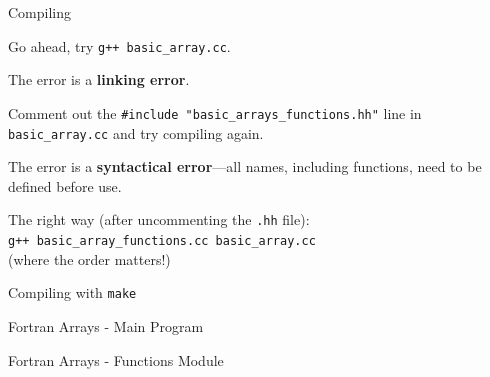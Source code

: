 \documentclass[aspectratio=1610]{beamer}
\begin{document}
\begin{frame}{Compiling}

 Go ahead, try {\tt g++ basic\_array.cc}.

 \pause
 
 \vfill
 The error is a {\bf linking error}.  
 
 \pause 
 
 \vfill
 Comment out the {\tt \#include "basic\_arrays\_functions.hh"} line 
 in {\tt basic\_array.cc} and try compiling again.
 
 \pause 
 \vfill
 The error is a {\bf syntactical error}---all names, including 
 functions, need to be defined before use.
 
 \pause 
 \vfill
 The right way (after uncommenting the {\tt .hh} file): \\
 
 {\tt g++ basic\_array\_functions.cc basic\_array.cc}\\
 
 (where the order matters!)
 
 
\end{frame}

\begin{frame}{Compiling with {\tt make}}
  
\end{frame}

\begin{frame}[allowframebreaks]{Fortran Arrays - Main Program}
 
\end{frame}

\begin{frame}[allowframebreaks]{Fortran Arrays - Functions Module}
 
\end{frame}
\end{document}
